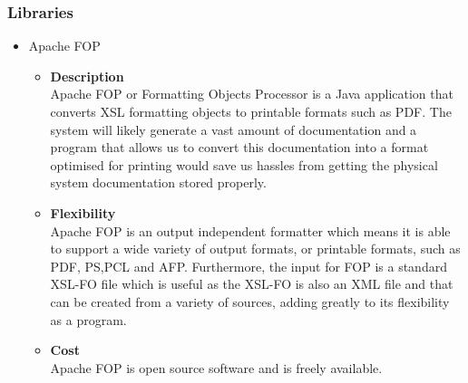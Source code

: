 \documentclass[a4paper,10pt]{article}
\begin{document}
\subsubsection{Libraries}
	\begin{itemize}
		\item Apache FOP
			\begin{itemize}
				\item \textbf{Description}\\
				Apache FOP or Formatting Objects Processor is a Java application that converts XSL formatting objects to printable formats such as PDF. The system will likely generate a vast amount of documentation and a program that allows us to convert this documentation into a format optimised for printing would save us hassles from getting the physical system documentation stored properly.
				\item \textbf{Flexibility}\\
				Apache FOP is an output independent formatter which means it is able to support a wide variety of output formats, or printable formats, such as PDF, PS,PCL and AFP. Furthermore, the input for FOP is a standard XSL-FO file which is useful as the XSL-FO is also an XML file and that can be created from a variety of sources, adding greatly to its flexibility as a program.
				\item \textbf{Cost}\\
				Apache FOP is open source software and is freely available.
			\end{itemize}
	\end{itemize}
\end{document}

